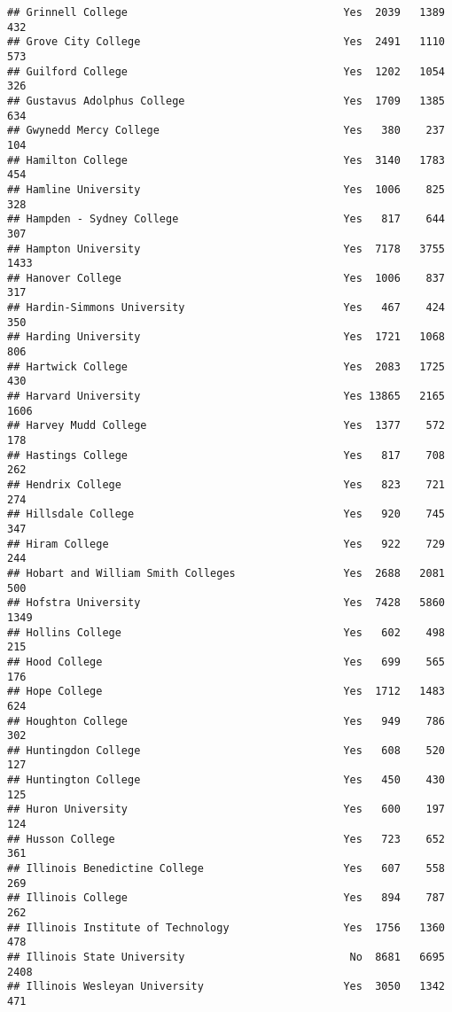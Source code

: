 \documentclass[
]{article}
\begin{document}
\begin{verbatim}
## Grinnell College                                  Yes  2039   1389    432
## Grove City College                                Yes  2491   1110    573
## Guilford College                                  Yes  1202   1054    326
## Gustavus Adolphus College                         Yes  1709   1385    634
## Gwynedd Mercy College                             Yes   380    237    104
## Hamilton College                                  Yes  3140   1783    454
## Hamline University                                Yes  1006    825    328
## Hampden - Sydney College                          Yes   817    644    307
## Hampton University                                Yes  7178   3755   1433
## Hanover College                                   Yes  1006    837    317
## Hardin-Simmons University                         Yes   467    424    350
## Harding University                                Yes  1721   1068    806
## Hartwick College                                  Yes  2083   1725    430
## Harvard University                                Yes 13865   2165   1606
## Harvey Mudd College                               Yes  1377    572    178
## Hastings College                                  Yes   817    708    262
## Hendrix College                                   Yes   823    721    274
## Hillsdale College                                 Yes   920    745    347
## Hiram College                                     Yes   922    729    244
## Hobart and William Smith Colleges                 Yes  2688   2081    500
## Hofstra University                                Yes  7428   5860   1349
## Hollins College                                   Yes   602    498    215
## Hood College                                      Yes   699    565    176
## Hope College                                      Yes  1712   1483    624
## Houghton College                                  Yes   949    786    302
## Huntingdon College                                Yes   608    520    127
## Huntington College                                Yes   450    430    125
## Huron University                                  Yes   600    197    124
## Husson College                                    Yes   723    652    361
## Illinois Benedictine College                      Yes   607    558    269
## Illinois College                                  Yes   894    787    262
## Illinois Institute of Technology                  Yes  1756   1360    478
## Illinois State University                          No  8681   6695   2408
## Illinois Wesleyan University                      Yes  3050   1342    471

\end{verbatim}
\end{document}

